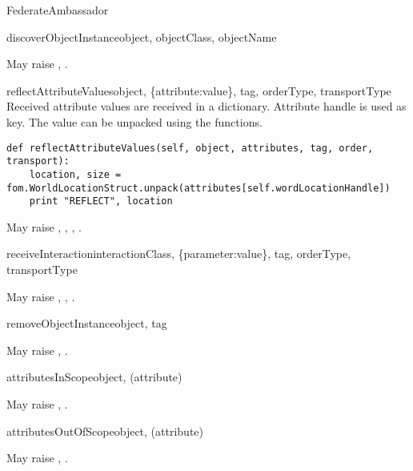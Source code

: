 \begin{classdesc}{FederateAmbassador}{}
\begin{methoddesc}{discoverObjectInstance}{object, objectClass, objectName}

May raise
,
.
\end{methoddesc}

\begin{methoddesc}{reflectAttributeValues}{object, \{attribute:value\}, tag, orderType, transportType}
Received attribute values are received in a dictionary. Attribute handle is used as key.
The value can be unpacked using the  functions.
\begin{verbatim}
def reflectAttributeValues(self, object, attributes, tag, order, transport):
    location, size = fom.WorldLocationStruct.unpack(attributes[self.wordLocationHandle])
    print "REFLECT", location
\end{verbatim}

May raise
,
,
,
.
\end{methoddesc}

\begin{methoddesc}{receiveInteraction}{interactionClass, \{parameter:value\}, tag, orderType, transportType}

May raise
,
,
.
\end{methoddesc}

\begin{methoddesc}{removeObjectInstance}{object, tag}

May raise
,
.
\end{methoddesc}

\begin{methoddesc}{attributesInScope}{object, (attribute)}

May raise
,
.
\end{methoddesc}

\begin{methoddesc}{attributesOutOfScope}{object, (attribute)}

May raise
,
.
\end{methoddesc}


\end{classdesc}
